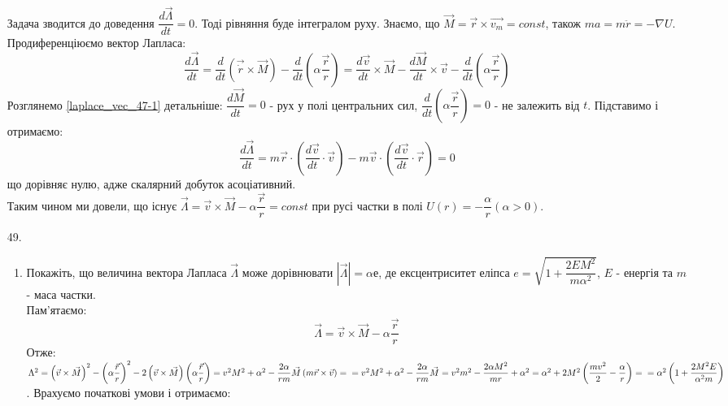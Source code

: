 \documentclass[a4paper,12pt]{article}
\begin{document}
\begin{justify}
\begin{itemize}
			Задача зводится до доведення $\dfrac{d\vec{\Lambda}}{dt}=0$. Тоді рівняння буде інтегралом руху. Знаємо, що $\vec{M}=\vec{r}\times\vec{v_m}=const$, також $ma=m\ddot{r}=-\nabla U$. Продиференціюємо вектор Лапласа:
			\begin{equation}
				\dfrac{d\vec{\Lambda}}{dt}=\dfrac{d}{dt}\left(\vec{\dot{r}}\times\vec{M}\right)-\dfrac{d}{dt}\left(\alpha\dfrac{\vec{r}}{r}\right)=\dfrac{d\vec{v}}{dt}\times\vec{M}-\dfrac{d\vec{M}}{dt}\times\vec{v}-\dfrac{d}{dt}\left(\alpha\dfrac{\vec{r}}{r}\right)
				\label{laplace_vec_47-1}
			\end{equation} 
			Розглянемо \ref{laplace_vec_47-1} детальніше: $\dfrac{d\vec{M}}{dt}=0$ - рух у полі центральних сил, $\dfrac{d}{dt}\left(\alpha\dfrac{\vec{r}}{r}\right)=0$ - не залежить від $t$. Підставимо і отримаємо:
			\begin{equation}
				\dfrac{d\vec{\Lambda}}{dt}=m\vec{r}\cdot\left(\dfrac{d\vec{v}}{dt}\cdot\vec{v}\right)-m\vec{v}\cdot\left(\dfrac{d\vec{v}}{dt}\cdot\vec{r}\right)=0
				\label{laplace_vec_47-2}
			\end{equation}
			що дорівняє нулю, адже скалярний добуток асоціативний.\\
			Таким чином ми довели, що існує $\vec{\Lambda} = \vec{v}\times\vec{M}- \alpha\dfrac{\vec{r}}{r} = const$ при русі частки в полі $U(r) = -\dfrac{\alpha}{r} (\alpha > 0)$.
		\item [49.] 
			\begin{enumerate}[label=(\alph*)]
				\item Покажіть, що величина вектора Лапласа $\vec{\Lambda}$  може дорівнювати $|\vec{\Lambda}| = \alpha е$, де ексцентриситет еліпса $e= \sqrt{1+\dfrac{2EM^2}{m\alpha^2}}$, $E$ - енергія та $m$ - маса частки.\\
					Пам'ятаємо:
					\begin{equation}
						\vec{\Lambda} = \vec{v}\times\vec{M}- \alpha\dfrac{\vec{r}}{r}
						\label{laplace_vec_49a-1}
					\end{equation}
					Отже: $\Lambda^2=\left(\vec{v}\times\vec{M}\right)^2-\left(\alpha\dfrac{\vec{r}}{r}\right)^2-2\left(\vec{v}\times\vec{M}\right)\left(\alpha\dfrac{\vec{r}}{r}\right)=v^2M^2+\alpha^2-\dfrac{2\alpha}{rm}\vec{M}\left(m\vec{r}\times\vec{v}\right)=\\=v^2M^2+\alpha^2-\dfrac{2\alpha}{rm}\vec{M}=v^2m^2-\dfrac{2\alpha M^2}{mr}+\alpha^2=\alpha^2+2M^2\left(\dfrac{mv^2}{2}-\dfrac{\alpha}{r}\right)=\\=\alpha^2\left(1+\dfrac{2M^2E}{\alpha^2m}\right)$. Врахуємо початкові умови і отримаємо:

\end{enumerate}
\end{itemize}
\end{justify}
\end{document}
